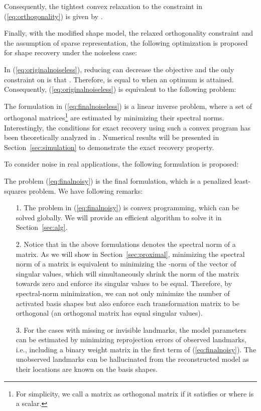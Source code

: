 \documentclass[10pt,journal,cspaper,compsoc]{IEEEtran}
\newcommand{\refEq}[1]{(\ref{#1})}
\newcommand{\refSec}[1]{Section~\ref{#1}}
\begin{document}
Consequently, the tightest convex relaxation to the constraint in \refEq{eq:orthogonality} is given by .


Finally, with the modified shape model, the relaxed orthogonality constraint and the assumption of sparse representation, the following optimization is proposed for shape recovery under the noiseless case:

In \refEq{eq:originalnoiseless}, reducing  can decrease the objective and the only constraint on  is that . Therefore,  is equal to  when an optimum is attained. Consequently, \refEq{eq:originalnoiseless} is equivalent to the following problem:

The formulation in \refEq{eq:finalnoiseless} is a linear inverse problem, where a set of orthogonal matrices\footnote{For simplicity, we call a matrix  as orthogonal matrix if it satisfies  or  where  is a scalar.} are estimated by minimizing their spectral norms. Interestingly, the conditions for exact recovery using such a convex program has been theoretically analyzed in \cite{chandrasekaran2012convex}. Numerical results will be presented in \refSec{sec:simulation} to demonstrate the exact recovery property.

To consider noise in real applications, the following formulation is proposed:

The problem \refEq{eq:finalnoisy} is the final formulation, which is a penalized least-squares problem. We have following remarks:
\begin{itemize}
\item[1.] The problem in \refEq{eq:finalnoisy} is convex programming, which can be solved globally. We will provide an efficient algorithm to solve it in \refSec{sec:alg}.
\item[2.] Notice that  in the above formulations denotes the spectral norm of a matrix. As we will show in \refSec{sec:proximal}, minimizing the spectral norm of a matrix is equivalent to minimizing the -norm of the vector of singular values, which will simultaneously shrink the norm of the matrix towards zero and enforce its singular values to be equal. Therefore, by spectral-norm minimization, we can not only minimize the number of activated basis shapes but also enforce each transformation matrix  to be orthogonal (an orthogonal matrix has equal singular values).
\item[3.] For the cases with missing or invisible landmarks, the model parameters can be estimated by minimizing reprojection errors of observed landmarks, i.e., including a binary weight matrix in the first term of \refEq{eq:finalnoisy}. The unobserved landmarks can be hallucinated from the reconstructed model as their locations are known on the basis shapes.
\end{itemize}
\end{document}
